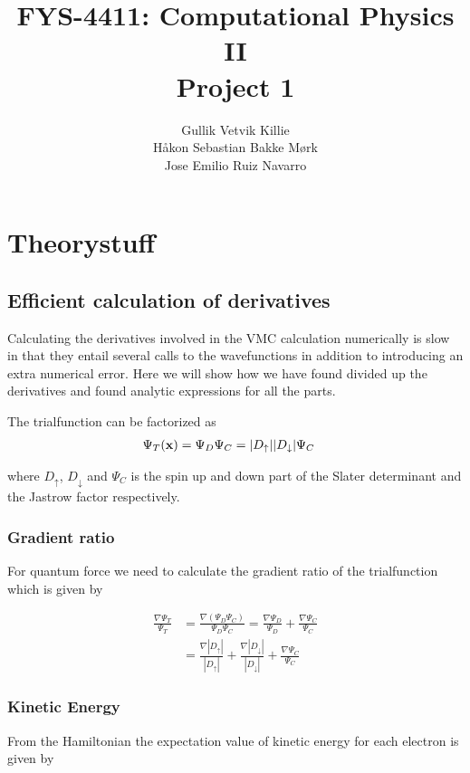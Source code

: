 \documentclass[11pt]{article}
\title{ FYS-4411: Computational Physics II \\ Project 1 }
\author{Gullik Vetvik Killie\\
		Håkon Sebastian Bakke Mørk\\
		Jose Emilio Ruiz Navarro
		}
\begin{document}
\maketitle

\abstract{}

\section{Theorystuff}

\subsection{Efficient calculation of derivatives}
	Calculating the derivatives involved in the VMC calculation numerically is slow in that they entail several calls to the wavefunctions in addition to introducing an extra numerical error. Here we will show how we have found divided up the derivatives and found analytic expressions for all the parts.

	The trialfunction can be factorized as
	\begin{align}
	\Psi_T(\vb{x}) &= \Psi_{D} \Psi_C= |D_\uparrow| |D_\downarrow| \Psi_C \label{eq:factorization}
	\end{align}

	where \(D_\uparrow\), \(D_\downarrow\) and \(\Psi_C\) is the spin up and down part of the Slater determinant and the Jastrow factor respectively.

	\subsubsection{Gradient ratio}
		For quantum force we need to calculate the gradient ratio of the trialfunction which is given by

		\begin{align}
			\frac{\nabla \Psi_T}{ \Psi_T } &= \frac{\nabla( \Psi_D\Psi_C  )}{ \Psi_D\Psi_C } = \frac{ \nabla \Psi_D }{\Psi_D } + \frac{\nabla \Psi_C}{\Psi_C}
			\\
			&= \frac{\nabla |D_\uparrow|}{|D_\uparrow|} + \frac{ \nabla |D_\downarrow|}{|D_\downarrow|} + \frac{\nabla \Psi_C}{\Psi_C} 
		\end{align}

	\subsubsection{Kinetic Energy}
		From the Hamiltonian the expectation value of kinetic energy for each electron is given by
\end{document}
